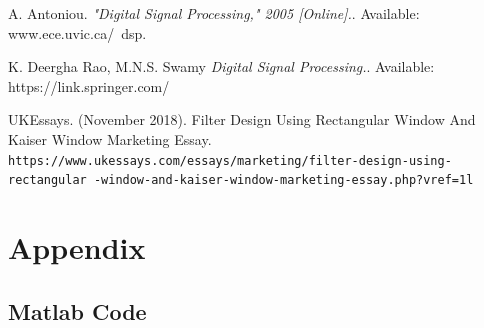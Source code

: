 \documentclass[oneside,11pt,onecolumn,a4paper]{report}
\begin{document}
\medskip

\pagebreak

\begin{thebibliography}{9}
A. Antoniou. 
\textit{"Digital Signal Processing," 2005 [Online].}. 
Available: www.ece.uvic.ca/~dsp.

K. Deergha Rao, M.N.S. Swamy
\textit{Digital Signal Processing.}. 
Available: https://link.springer.com/

UKEssays. (November 2018). Filter Design Using Rectangular Window And Kaiser Window Marketing Essay. 
\\\texttt{https://www.ukessays.com/essays/marketing/filter-design-using-rectangular
-window-and-kaiser-window-marketing-essay.php?vref=1l}
\end{thebibliography}

\pagebreak

\appendix
\chapter{Appendix}
\section{Matlab Code}

\end{document}
